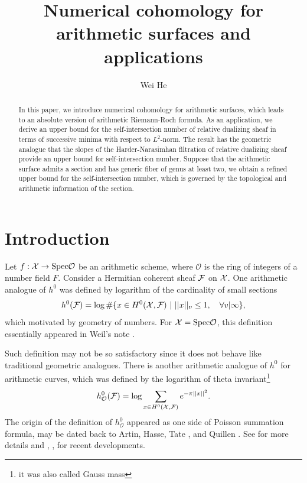 \documentclass[]{amsart}
\newcommand{\CO}{{\mathcal {O}}} \newcommand{\CP}{{\mathcal {P}}}
\newcommand{\Spec}{{\mathrm{Spec}}} \newcommand{\Spf}{{\mathrm{Spf}}}
\newcommand{\ra}{\rightarrow} \newcommand{\imp}{\Longrightarrow}
\theoremstyle{plain}
\theoremstyle{remark} \newtheorem{remark}[thm]{Remark}
\theoremstyle{remark} \newtheorem{exercise}{Exercise}
\theoremstyle{remark} \newtheorem{example}{Example}
\numberwithin{equation}{section}
\begin{document}
\title{Numerical cohomology for arithmetic surfaces and applications}
\author{Wei He}
\address{School of Mathematics and Statistics, Xi'an Jiaotong University, Xi'an 710049, P.R. China.} 
\begin{abstract}In this paper, we introduce numerical cohomology for arithmetic surfaces, which leads to an absolute version of arithmetic Riemann-Roch formula. As an application, we derive an upper bound for the self-intersection number of relative dualizing sheaf in terms of successive minima with respect to $L^2$-norm. The result has the geometric analogue that the slopes of the Harder-Narasimhan filtration of relative dualizing sheaf provide an upper bound for self-intersection number. Suppose that the arithmetic surface admits a section and has generic fiber of genus at least two, we obtain a refined upper bound for the self-intersection number, which is governed by the topological and arithmetic information of the section.\end{abstract}
\maketitle 


\tableofcontents 
 
 
\section{Introduction}\label{sec1}
Let $f: \CX\ra \Spec\CO$ be an arithmetic scheme, where $\CO$ is the ring of integers of a number field $F$. Consider a Hermitian coherent sheaf ${{\mathcal {F}}}$ on ${\mathcal {X}}$.
One arithmetic analogue of $h^0$ was defined by logarithm of the cardinality of small sections
\[h^0(\CF)=\log\#\{x\in H^0(\CX,\CF)\ |\ ||x||_{v}\leq 1,\quad \forall v|\infty\},\]which motivated by geometry of numbers. For $\CX=\Spec\CO$, this definition essentially appeared in Weil's note \cite{Weil:1939}. 

Such definition may not be so satisfactory since it does not behave like traditional geometric analogues. There is another arithmetic analogue of $h^0$ for arithmetic curves, which was defined by the logarithm of theta invariant\footnote{it was also called Gauss mass}
\[h_{\CO}^0(\CF)=\log \sum_{x\in H^0(\CX,\CF)}e^{-\pi ||x||^2}.\]
The origin of the definition of $h_\CO^0$ appeared as one side of Poisson summation formula, may be dated back to Artin, Hasse, Tate \cite[Sec.~4.2]{Tate:67}, and Quillen \cite{Quillen}. See \cite[Sec.~0.1.2]{Bost:2020} for more details and \cite{Groenewegen}, \cite{Geer-Schoof}, \cite{Bost:2020} for recent developments. 
\end{document}

